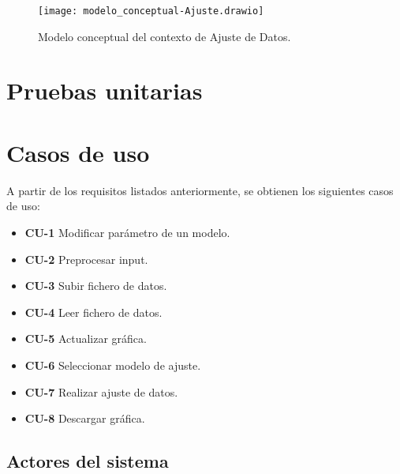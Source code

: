 \begin{figure}[!h]
\begin{center}
\caption{Modelo conceptual del contexto de Ajuste de Datos.}
\label{diag: modelo_concep_ajuste}
\texttt{[image: modelo\_conceptual-Ajuste.drawio]}
\end{center}
\end{figure}







\section{Pruebas unitarias}



\section{Casos de uso}

A partir de los requisitos listados anteriormente, se obtienen los siguientes casos de uso:

\begin{itemize}
\item \textbf{CU-1} Modificar parámetro de un modelo.
\item \textbf{CU-2} Preprocesar input.
\item \textbf{CU-3} Subir fichero de datos.
\item \textbf{CU-4} Leer fichero de datos.
\item \textbf{CU-5} Actualizar gráfica.
\item \textbf{CU-6} Seleccionar modelo de ajuste.
\item \textbf{CU-7} Realizar ajuste de datos.
\item \textbf{CU-8} Descargar gráfica.
\end{itemize}

\subsection{Actores del sistema}

